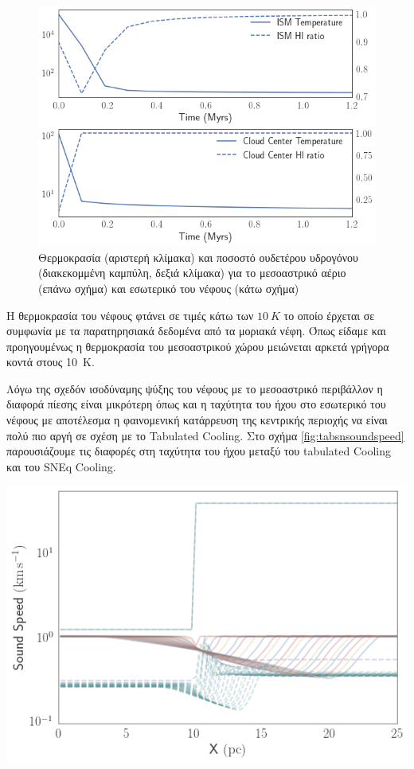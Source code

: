 \begin{figure}[h]
	\centering
	\includegraphics[width=1\linewidth]{DataImages/SNCoolingTMPcenterISM}
	\caption{Θερμοκρασία (αριστερή κλίμακα) και ποσοστό ουδετέρου υδρογόνου (διακεκομμένη καμπύλη, δεξιά κλίμακα) για το μεσοαστρικό αέριο (επάνω σχήμα) και εσωτερικό του νέφους (κάτω σχήμα)}
	\label{fig:sncoolingtmpcenterism} 
\end{figure}
	

Η θερμοκρασία του νέφους φτάνει σε τιμές κάτω των $\SI{10}{K}$ το οποίο έρχεται σε συμφωνία με τα  παρατηρησιακά δεδομένα από τα μοριακά νέφη. Όπως είδαμε και προηγουμένως η θερμοκρασία του μεσοαστρικού χώρου μειώνεται αρκετά γρήγορα κοντά στους \SI{10}{K}.

Λόγω της σχεδόν ισοδύναμης ψύξης του νέφους με το μεσοαστρικό περιβάλλον η διαφορά πίεσης είναι μικρότερη όπως και η ταχύτητα του ήχου στο εσωτερικό του νέφους με αποτέλεσμα η φαινομενική κατάρρευση της κεντρικής περιοχής να είναι πολύ πιο αργή σε σχέση με το Tabulated Cooling. Στο σχήμα \ref{fig:tabsnsoundspeed} παρουσιάζουμε τις διαφορές στη ταχύτητα του ήχου μεταξύ του tabulated Cooling και του SNEq Cooling.

\begin{marginfigure}
	\centering
	\includegraphics[width=1\linewidth]{DataImages/TabSNSoundSpeed}
	\caption{}
	\label{fig:tabsnsoundspeed}
\end{marginfigure}

